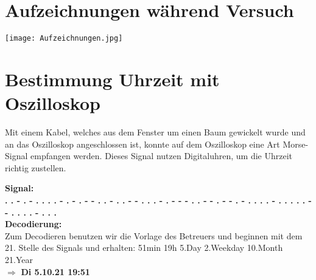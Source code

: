 \section*{Aufzeichnungen während Versuch}
\begin{center}
    \texttt{[image: Aufzeichnungen.jpg]}
    \label{image:aufzeichnungen}
\end{center}
\section*{Bestimmung Uhrzeit mit Oszilloskop}
Mit einem Kabel, welches aus dem Fenster um einen Baum gewickelt wurde und an das Oszilloskop angeschlossen ist, konnte auf dem Oszilloskop eine Art Morse-Signal empfangen werden. Dieses Signal nutzen Digitaluhren, um die Uhrzeit richtig zustellen.

\textbf{Signal:}\\
\textbf{. . - . - . . . . - 
        . - . - - . . - . . 
        - - . . . - . - - - 
        . . - - . - - . - . 
        . . . - . . . . . - 
        - . . . . - . . . }\\
\textbf{Decodierung:}\\
Zum Decodieren benutzen wir die Vorlage des Betreuers und beginnen mit dem 21. Stelle des Signals und erhalten: 51min 19h 5.Day 2.Weekday 10.Month 21.Year \\$\Rightarrow$ \textbf{Di 5.10.21 19:51}

